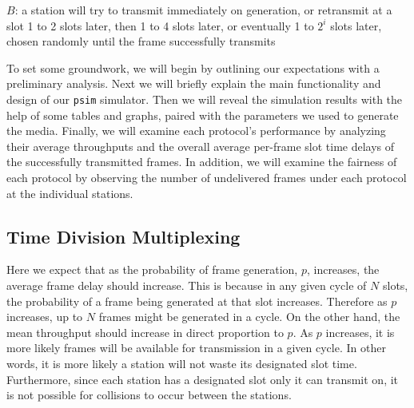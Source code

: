 \documentclass[twocolumn]{article}
\begin{document}
$B$: a station will try to transmit immediately on generation, or retransmit at
a slot 1 to 2 slots later, then 1 to 4 slots later, or eventually 1 to $2^i$
slots later, chosen randomly until the frame successfully transmits

	To set some groundwork, we will begin by outlining our expectations with
	a preliminary analysis. Next we will briefly explain the main
	functionality and design of our \verb|psim| simulator. Then we will reveal the
	simulation results with the help of some tables and graphs, paired with
	the parameters we used to generate the media. Finally, we will examine
	each protocol's performance by analyzing their average throughputs and
	the overall average per-frame slot time delays of the successfully
	transmitted frames. In addition, we will examine the fairness of each
	protocol by observing the number of undelivered frames under each
	protocol at the individual stations.

%
%

\subsection*{Time Division Multiplexing} Here we expect that as the probability
of frame generation, $p$, increases, the average frame delay should increase. This is
because in any given cycle of $N$ slots, the probability of a frame being
generated at that slot increases. Therefore as $p$ increases, up to $N$ frames
might be generated in a cycle.  On the other hand, the mean throughput should
increase in direct proportion to $p$. As $p$ increases, it is more likely frames
will be available for transmission in a given cycle. In other words, it is more
likely a station will not waste its designated slot time. Furthermore, since
each station has a designated slot only it can transmit on, it is not possible
for collisions to occur between the stations.
\end{document}
